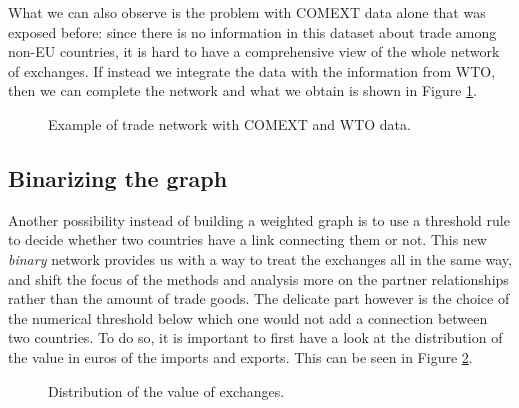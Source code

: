 What we can also observe is the problem with COMEXT data alone that was exposed before: since there is no information in this dataset about trade among non-EU countries, it is hard to have a comprehensive view of the whole network of exchanges. If instead we integrate the data with the information from WTO, then we can complete the network and what we obtain is shown in Figure \ref{fig:gcomplete}.

\begin{figure}
    \caption{Example of trade network with COMEXT and WTO data.}
    \label{fig:gcomplete}
\end{figure}


\subsection{Binarizing the graph}
Another possibility instead of building a weighted graph is to use a threshold rule to decide whether two countries have a link connecting them or not. This new \textit{binary} network provides us with a way to treat the exchanges all in the same way, and shift the focus of the methods and analysis more on the partner relationships rather than the amount of trade goods. The delicate part however is the choice of the numerical threshold below which one would not add a connection between two countries. To do so, it is important to first have a look at the distribution of the value in euros of the imports and exports. This can be seen in Figure \ref{fig:excdistr}.

\begin{figure}
    \caption{Distribution of the value of exchanges.}
    \label{fig:excdistr}
\end{figure}


